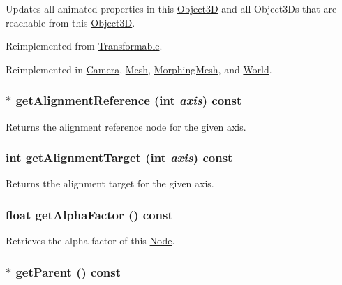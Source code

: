Updates all animated properties in this \hyperlink{classm3g_1_1Object3D}{Object3D} and all Object3Ds that are reachable from this \hyperlink{classm3g_1_1Object3D}{Object3D}. 

Reimplemented from \hyperlink{classm3g_1_1Transformable_8aad1ceab4c2a03609c8a42324ce484d}{Transformable}.

Reimplemented in \hyperlink{classm3g_1_1Camera_8aad1ceab4c2a03609c8a42324ce484d}{Camera}, \hyperlink{classm3g_1_1Mesh_82cfeb67ca66b93e2ca7bda9a4f0e2aa}{Mesh}, \hyperlink{classm3g_1_1MorphingMesh_8aad1ceab4c2a03609c8a42324ce484d}{MorphingMesh}, and \hyperlink{classm3g_1_1World_8aad1ceab4c2a03609c8a42324ce484d}{World}.\hypertarget{classm3g_1_1Node_ca338390bd2dee287fe6f5cbc4e094e1}{
\subsubsection[{getAlignmentReference}]{ $\ast$ getAlignmentReference (int {\em axis}) const}}
\label{classm3g_1_1Node_ca338390bd2dee287fe6f5cbc4e094e1}


Returns the alignment reference node for the given axis. \hypertarget{classm3g_1_1Node_e5bbf42b3d88193fda0b476e1b1da009}{
\subsubsection[{getAlignmentTarget}]{\setlength{\rightskip}{0pt plus 5cm}int getAlignmentTarget (int {\em axis}) const}}
\label{classm3g_1_1Node_e5bbf42b3d88193fda0b476e1b1da009}


Returns tthe alignment target for the given axis. \hypertarget{classm3g_1_1Node_bf7e8f9d9f530274aaf27e69910f8689}{
\subsubsection[{getAlphaFactor}]{\setlength{\rightskip}{0pt plus 5cm}float getAlphaFactor () const}}
\label{classm3g_1_1Node_bf7e8f9d9f530274aaf27e69910f8689}


Retrieves the alpha factor of this \hyperlink{classm3g_1_1Node}{Node}. \hypertarget{classm3g_1_1Node_ce26c2757f265bc6038e6818d2eb6ad9}{
\subsubsection[{getParent}]{ $\ast$ getParent () const}}
\label{classm3g_1_1Node_ce26c2757f265bc6038e6818d2eb6ad9}


